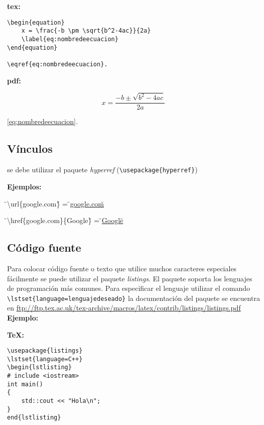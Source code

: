 \documentclass[12pt, a4paper,twoside]{article} %
\begin{document}
\noindent\textbf{tex:}

\begin{lstlisting}
\begin{equation} 
    x = \frac{-b \pm \sqrt{b^2-4ac}}{2a} 
    \label{eq:nombredeecuacion}
\end{equation}

\eqref{eq:nombredeecuacion}.
\end{lstlisting}

\noindent\textbf{pdf:}

\begin{equation} 
x = \frac{-b \pm \sqrt{b^2-4ac}}{2a}
\label{eq:nombredeecuacion}
\end{equation}

\eqref{eq:nombredeecuacion}.

\subsection{Vínculos}

se debe utilizar el paquete \emph{hyperref} (\lstinline$\usepackage{hyperref}$)

\textbf{Ejemplos:}

\begin{center}
\"{}\textbackslash url\{google.com\}\"{} = \"{}\url{google.com}\"{}

\"{}\textbackslash href\{google.com\}\{Google\}\"{} = \"{}\href{google.com}{Google}\"{}
\end{center}

\subsection{Código fuente}

Para colocar código fuente o texto que utilice muchos caracteres especiales fácilmente se puede utilizar el paquete \emph{listings}. El paquete soporta los lenguajes de programación más comunes. Para especificar el lenguaje utilizar el comando \lstinline$\lstset{language=lenguajedeseado}$ la documentación del paquete se encuentra en \url{ftp://ftp.tex.ac.uk/tex-archive/macros/latex/contrib/listings/listings.pdf}\\

\noindent\textbf{Ejemplo:}

\textbf{TeX:}
\begin{lstlisting}
\usepackage{listings}
\lstset{language=C++}
\begin{lstlisting}
# include <iostream>
int main()
{
    std::cout << "Hola\n";
}
end{lstlisting}
\end{lstlisting}
\end{document}
